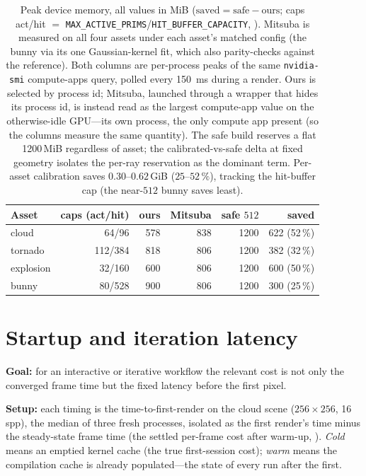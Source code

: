 \begin{table}[htp]
  \centering
  \begin{tabular}{@{}lrrrrr@{}}
    \toprule
    Asset & caps (act/hit) & ours & Mitsuba & safe \(512\) & saved \\
    \midrule
    cloud     & 64/96   & 578 & 838 & 1200 & 622 (52\,\%) \\
    tornado   & 112/384 & 818 & 806 & 1200 & 382 (32\,\%) \\
    explosion & 32/160  & 600 & 806 & 1200 & 600 (50\,\%) \\
    bunny     & 80/528  & 900 & 806 & 1200 & 300 (25\,\%) \\
    \bottomrule
  \end{tabular}
  \caption{Peak device memory, all values in MiB (\(\text{saved}=\text{safe}-\text{ours}\);
caps act/hit ${=}$ \texttt{MAX\_ACTIVE\_PRIMS}/\texttt{HIT\_BUFFER\_CAPACITY},
). Mitsuba is
  measured on all four assets under each asset's matched config (the bunny via its one
Gaussian-kernel fit,
  which  also parity-checks against the reference). Both columns
  are per-process peaks of the same \texttt{nvidia-smi} compute-apps query, polled every
  \SI{150}{\milli\second} during a render. Ours is selected by process id; Mitsuba, launched
  through a wrapper that hides its process id, is instead read as the largest compute-app
  value on the otherwise-idle GPU---its own process, the only compute app present (so the
  columns measure the same quantity). The safe build reserves a flat 1200\,MiB regardless of asset; the calibrated-vs-safe delta
at fixed geometry isolates the per-ray reservation as the dominant term. Per-asset
calibration saves $0.30$--$0.62\,$GiB ($25$--$52\,\%$), tracking the hit-buffer cap (the
near-\(512\) bunny saves least).}
  \label{tab:vram}
\end{table}

\section{Startup and iteration latency}
\label{sec:results-startup}

\textbf{Goal:} for an interactive or iterative workflow the relevant cost is not only the converged
frame time but the fixed latency before the first pixel.

\textbf{Setup:} each timing is the
time-to-first-render on the cloud scene ($256\times256$, \num{16}\,spp), the median of three fresh
processes, isolated as the first render's time minus the steady-state frame time (the settled
per-frame cost after warm-up, ). \emph{Cold} means an emptied
kernel cache (the true first-session cost); \emph{warm} means the compilation cache is already
populated---the state of every run after the first.

